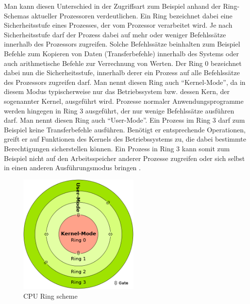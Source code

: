 Man kann diesen Unterschied in der Zugriffsart zum Beispiel anhand der Ring-Schemas aktueller Prozessoren verdeutlichen. Ein Ring bezeichnet dabei eine Sicherheitsstufe eines Prozesses, der vom Prozessor verarbeitet wird. Je nach Sicherheitsstufe darf der Prozess dabei auf mehr oder weniger Befehlssätze innerhalb des Prozessors zugreifen. Solche Befehlssätze beinhalten zum Beispiel Befehle zum Kopieren von Daten (Transferbefehle) innerhalb des Systems oder auch arithmetische Befehle zur Verrechnung von Werten. Der Ring 0 bezeichnet dabei nun die Sicherheitsstufe, innerhalb derer ein Prozess auf alle Befehlssätze des Prozessors zugreifen darf. Man nennt diesen Ring auch "`Kernel-Mode"', da in diesem Modus typischerweise nur das Betriebssystem bzw. dessen Kern, der sogenannter Kernel, ausgeführt wird. Prozesse normaler Anwendungsprogramme werden hingegen in Ring 3 ausgeführt, der nur wenige Befehlssätze ausführen darf. Man nennt diesen Ring auch "`User-Mode"'. Ein Prozess im Ring 3 darf zum Beispiel keine Transferbefehle ausführen. Benötigt er entsprechende Operationen, greift er auf Funktionen des Kernels des Betriebssystems zu, die dabei bestimmte Berechtigungen sicherstellen können. Ein Prozess in Ring 3 kann somit zum Beispiel nicht auf den Arbeitsspeicher anderer Prozesse zugreifen oder sich selbst in einen anderen Ausführungsmodus bringen \citep[Vgl.][]{wiki:005}.

\begin{figure}[!ht]
  \begin{center}
    \includegraphics[width=6cm]{bilder/500px-CPU_ring_scheme.png}
    \caption{CPU Ring scheme \citep{wiki:006}}
  \end{center}
\end{figure}

